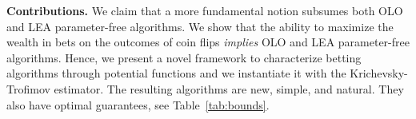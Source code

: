 \textbf{Contributions.} We claim that a more fundamental notion
subsumes both \ac{OLO} and \ac{LEA} parameter-free algorithms. We show that the ability to maximize the wealth in bets on the outcomes of coin flips \emph{implies} \ac{OLO} and \ac{LEA} parameter-free algorithms.
Hence, we present a novel framework to characterize betting algorithms through potential functions and we instantiate it with the Krichevsky-Trofimov estimator.
The resulting algorithms are new, simple, and natural. They also have optimal guarantees, see Table~\ref{tab:bounds}.

\begin{table}
\begin{center}
\end{center}
\end{table}
